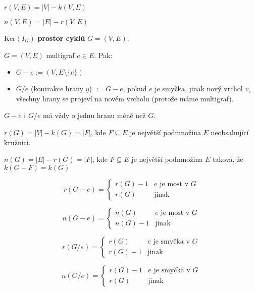 \begin{pozor}
	$r(V,E) = |V| - k(V,E)$
\end{pozor}

\begin{pozor}
	$n(V,E) = |E| - r(V,E)$
\end{pozor}

\begin{definice}
	$\text{Ker}(I_{G})$ \textbf{prostor cyklů} $G= (V,E)$.
\end{definice}

\begin{definice}
	$G = (V,E)$ multigraf $e \in E$. Pak:
	
	\begin{itemize}
		\item $G-e := (V, E \setminus \{e\})$
		\item $G / e$ (kontrakce hrany $y$) $:= G - e$, pokud $e$ je smyčka, jinak nový vrchol $v_{e}$ všechny hrany se projeví na novém vrcholu (protože máme multigraf).
	\end{itemize}
\end{definice}

\begin{pozor}
	$G-e$ i $G/e$ má vždy o jednu hranu méně než $G$.
\end{pozor}


$r(G) = |V| - k(G) = |F|$, kde $F \subseteq E$ je největší podmnožina $E$ neobsahující kružnici.

$n(G) = |E| - r(G) = |F|$, kde $F \subseteq E$ je největší podmnožina $E$ taková, že $k(G-F) = k(G)$

$$
r(G-e) = 
\left\{
\begin{array}{ll}
	r(G)-1 & e \text{ je most v } G \\
	r(G) & \text{jinak}
\end{array}
\right.
$$

$$
n(G-e) = 
\left\{
\begin{array}{ll}
	n(G) & e \text{ je most v } G \\
	n(G) - 1 & \text{jinak}
\end{array}
\right.
$$

$$
r(G/e) = 
\left\{
\begin{array}{ll}
	r(G) & e \text{ je smyčka v } G \\
	r(G)-1 & \text{jinak}
\end{array}
\right.
$$

$$
n(G/e) = 
\left\{
\begin{array}{ll}
	r(G)-1 & e \text{ je smyčka v } G \\
	r(G) & \text{jinak}
\end{array}
\right.
$$

